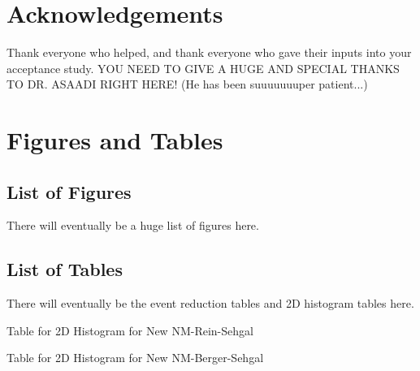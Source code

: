 \documentclass[11pt]{article}
\begin{document}
\section{Acknowledgements}
Thank everyone who helped, and thank everyone who gave their inputs into your acceptance study. YOU NEED TO GIVE A HUGE AND SPECIAL THANKS TO DR. ASAADI RIGHT HERE! (He has been suuuuuuuper patient...)



\section{Figures and Tables} \label{sec:FigTab}
\subsection{List of Figures}
There will eventually be a huge list of figures here.

\subsection{List of Tables}
There will eventually be the event reduction tables and 2D histogram tables here.

\newpage
\begin{landscape}
\begin{table}
\centering
\caption{Table for 2D Histogram for New NM-Rein-Sehgal}
\begin{adjustbox}{width=\paperwidth}
\end{adjustbox}
\end{table}
\end{landscape}

\newpage
\begin{landscape}
\begin{table}
\centering
\caption{Table for 2D Histogram for New NM-Berger-Sehgal}
\begin{adjustbox}{width=\paperwidth}
\end{adjustbox}
\end{table}
\end{landscape}
\end{document}
